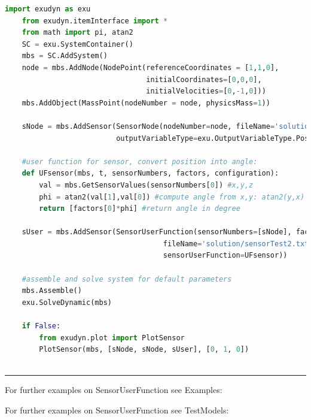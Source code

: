     \begin{lstlisting}[language=Python]
    import exudyn as exu
    from exudyn.itemInterface import *
    from math import pi, atan2
    SC = exu.SystemContainer()
    mbs = SC.AddSystem()
    node = mbs.AddNode(NodePoint(referenceCoordinates = [1,1,0], 
                                 initialCoordinates=[0,0,0],
                                 initialVelocities=[0,-1,0]))
    mbs.AddObject(MassPoint(nodeNumber = node, physicsMass=1))
    
    sNode = mbs.AddSensor(SensorNode(nodeNumber=node, fileName='solution/sensorTest.txt',
                          outputVariableType=exu.OutputVariableType.Position))

    #user function for sensor, convert position into angle:
    def UFsensor(mbs, t, sensorNumbers, factors, configuration):
        val = mbs.GetSensorValues(sensorNumbers[0]) #x,y,z
        phi = atan2(val[1],val[0]) #compute angle from x,y: atan2(y,x)
        return [factors[0]*phi] #return angle in degree
    
    sUser = mbs.AddSensor(SensorUserFunction(sensorNumbers=[sNode], factors=[180/pi], 
                                     fileName='solution/sensorTest2.txt',
                                     sensorUserFunction=UFsensor))

    #assemble and solve system for default parameters
    mbs.Assemble()
    exu.SolveDynamic(mbs)

    if False:
        from exudyn.plot import PlotSensor
        PlotSensor(mbs, [sNode, sNode, sUser], [0, 1, 0])
    
    \end{lstlisting}
\vspace{6pt}\par\noindent\rule{\textwidth}{0.4pt}
%
\noindent For further examples on SensorUserFunction see Examples:
\bi
\item{}\ei

%
%
\noindent For further examples on SensorUserFunction see TestModels:
\bi
\item{}\item{}\ei

%
